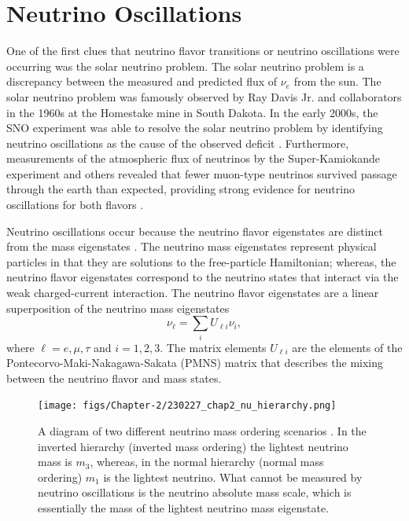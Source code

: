\section{Neutrino Oscillations}
\label{sec:chap2-nu-oscillation}

One of the first clues that neutrino flavor transitions or neutrino oscillations were occurring was the solar neutrino problem. The solar neutrino problem is a discrepancy between the measured and predicted flux of $\nu_e$ from the sun. The solar neutrino problem was famously observed by Ray Davis Jr. and collaborators in the 1960s \cite{ray_davis} at the Homestake mine in South Dakota. In the early 2000s, the SNO experiment was able to resolve the solar neutrino problem by identifying neutrino oscillations as the cause of the observed deficit \cite{SNO}. Furthermore, measurements of the atmospheric flux of neutrinos by the Super-Kamiokande experiment and others revealed that fewer muon-type neutrinos survived passage through the earth than expected, providing strong evidence for neutrino oscillations for both flavors \cite{superk}.

Neutrino oscillations occur because the neutrino flavor eigenstates are distinct from the mass eigenstates \cite{nu_oscillations}. The neutrino mass eigenstates represent physical particles in that they are solutions to the free-particle Hamiltonian; whereas, the neutrino flavor eigenstates correspond to the neutrino states that interact via the weak charged-current interaction. The neutrino flavor eigenstates are a linear superposition of the neutrino mass eigenstates
\begin{equation}
    \nu_\ell=\sum_i{U_{\ell i}\nu_i},
\end{equation}
where $\ell=e,\mu,\tau$ and $i=1,2,3$. The matrix elements $U_{\ell i}$ are the elements of the Pontecorvo-Maki-Nakagawa-Sakata (PMNS) matrix that describes the mixing between the neutrino flavor and mass states.

\begin{figure}[htbp]
    \centering
    \texttt{[image: figs/Chapter-2/230227\_chap2\_nu\_hierarchy.png]}
    \caption{A diagram of two different neutrino mass ordering scenarios \cite{nu_mass_ordering_figure_inspiration}. In the inverted hierarchy (inverted mass ordering) the lightest neutrino mass is $m_3$, whereas, in the normal hierarchy (normal mass ordering) $m_1$ is the lightest neutrino. What cannot be measured by neutrino oscillations is the neutrino absolute mass scale, which is essentially the mass of the lightest neutrino mass eigenstate.}
    \label{fig:chap2-nu-hierarchy}
\end{figure}

